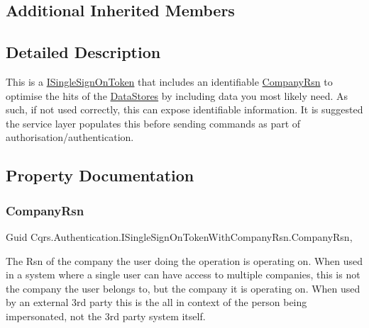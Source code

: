 \subsection*{Additional Inherited Members}


\subsection{Detailed Description}
This is a \hyperlink{interfaceCqrs_1_1Authentication_1_1ISingleSignOnToken}{I\+Single\+Sign\+On\+Token} that includes an identifiable \hyperlink{interfaceCqrs_1_1Authentication_1_1ISingleSignOnTokenWithCompanyRsn_a26ffa6ca2e583f0ecc440b68fe3edd52}{Company\+Rsn} to optimise the hits of the \hyperlink{}{Data\+Stores} by including data you most likely need. As such, if not used correctly, this can expose identifiable information. It is suggested the service layer populates this before sending commands as part of authorisation/authentication. 



\subsection{Property Documentation}
\mbox{\label{interfaceCqrs_1_1Authentication_1_1ISingleSignOnTokenWithCompanyRsn_a26ffa6ca2e583f0ecc440b68fe3edd52}} 
\subsubsection{\texorpdfstring{Company\+Rsn}{CompanyRsn}}
{\footnotesize\ttfamily Guid Cqrs.\+Authentication.\+I\+Single\+Sign\+On\+Token\+With\+Company\+Rsn.\+Company\+Rsn\hspace{0.3cm}{\ttfamily [get]}, {\ttfamily [set]}}



The Rsn of the company the user doing the operation is operating on. When used in a system where a single user can have access to multiple companies, this is not the company the user belongs to, but the company it is operating on. When used by an external 3rd party this is the all in context of the person being impersonated, not the 3rd party system itself. 

